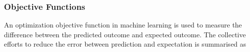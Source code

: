 \subsubsection{Objective Functions}
An optimization objective function in machine learning is used to measure the difference between the predicted outcome and expected outcome. The collective efforts to reduce the error between prediction and expectation is summarised as 
